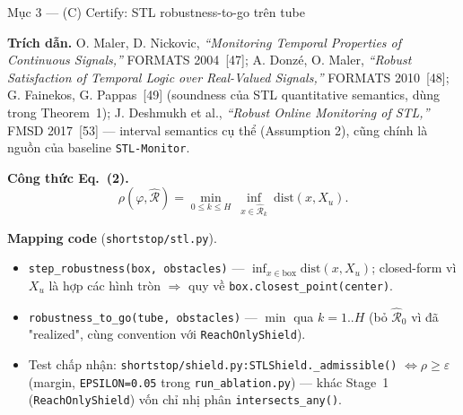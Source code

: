 \documentclass[aspectratio=169]{beamer}
\begin{document}
\begin{frame}[t,shrink=8]{Mục 3 --- (C) Certify: STL robustness-to-go trên tube}

\textbf{Trích dẫn.} O. Maler, D. Nickovic, \emph{``Monitoring Temporal Properties of Continuous Signals,''} FORMATS 2004~[47]; A. Donzé, O. Maler, \emph{``Robust Satisfaction of Temporal Logic over Real-Valued Signals,''} FORMATS 2010~[48]; G. Fainekos, G. Pappas~[49] (soundness của STL quantitative semantics, dùng trong Theorem~1); J. Deshmukh et al., \emph{``Robust Online Monitoring of STL,''} FMSD 2017~[53] --- interval semantics cụ thể (Assumption 2), cũng chính là nguồn của baseline \texttt{STL-Monitor}.

\vspace{5pt}
\textbf{Công thức Eq.~(2).}
\[
\rho(\varphi,\hat{\mathcal R})=\min_{0\le k\le H}\ \inf_{x\in\hat{\mathcal R}_k}\ \mathrm{dist}(x,X_u).
\]

\vspace{5pt}
\textbf{Mapping code} (\texttt{shortstop/stl.py}).
\begin{itemize}
    \item \texttt{step\_robustness(box, obstacles)} --- $\inf_{x\in\text{box}}\mathrm{dist}(x,X_u)$; closed-form vì $X_u$ là hợp các hình tròn $\Rightarrow$ quy về \texttt{box.closest\_point(center)}.
    \item \texttt{robustness\_to\_go(tube, obstacles)} --- $\min$ qua $k=1..H$ (bỏ $\hat{\mathcal R}_0$ vì đã "realized", cùng convention với \texttt{ReachOnlyShield}).
    \item Test chấp nhận: \texttt{shortstop/shield.py:STLShield.\_admissible()} $\Leftrightarrow \rho\ge\varepsilon$ (margin, \texttt{EPSILON=0.05} trong \texttt{run\_ablation.py}) --- khác Stage~1 (\texttt{ReachOnlyShield}) vốn chỉ nhị phân \texttt{intersects\_any()}.
\end{itemize}
\end{frame}
\end{document}
